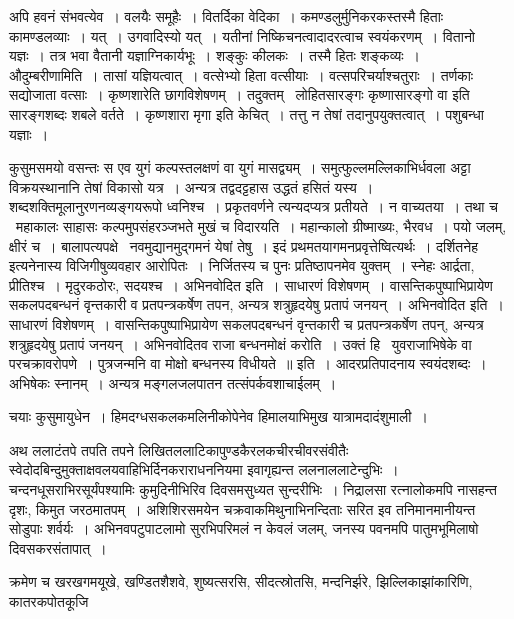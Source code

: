 \documentclass[11pt, openany]{book}
\begin{document}
\noindent
{\s अपि हवनं संभवत्येव~। वलयैः समूहैः~। वितर्दिका वेदिका~। कमण्डलुर्मुनिकरकस्तस्मै हिताः कामण्डलव्याः~। यत्~। {\qt उगवादिस्यो यत्}~। यतीनां निष्किचनत्वादादरत्वाच स्वयंकरणम्~। वितानो यज्ञः~। तत्र भवा वैतानी यज्ञाग्निकार्यभूः~। शङ्कुः कीलकः~। तस्मै हितः शङ्कव्यः~। {\qtt औदुम्बरीणामिति}~। तासां यज्ञियत्वात्~। वत्सेभ्यो हिता वत्सीयाः~। वत्सपरिचर्याश्चतुराः~। तर्णकाः सद्योजाता वत्साः~। कृष्णशारेति छागविशेषणम्~। तदुक्तम् \textendash\ {\qt लोहितसारङ्गः कृष्णासारङ्गो वा} इति सारङ्गशब्दः शबले वर्तते~। कृष्णशारा मृगा इति केचित्~। तत्तु न तेषां तदानुपयुक्तत्वात्~। पशुबन्धा यज्ञाः~।

कुसुमसमयो वसन्तः स एव युगं कल्पस्तलक्षणं वा युगं मासद्व्यम्~। समुत्फुल्लमल्लिकाभिर्धवला अट्टा विक्रयस्थानानि तेषां विकासो यत्र~। अन्यत्र तद्वदट्टहास उद्धतं हसितं यस्य~। शब्दशक्तिमूलानुरणनव्यङ्गयरूपो ध्वनिश्च~। प्रकृतवर्णने त्यन्यदप्यत्र प्रतीयते~। न वाच्यतया~। तथा च \textendash\ महाकालः साहासः कल्पमुपसंहरञ्जभते मुखं च विदारयति~। महान्कालो ग्रीष्माख्यः, भैरवध~। पयो जलम्, क्षीरं च~। बालापत्यपक्षे \textendash\ नवमुद्यानमुद्गमनं येषां तेषु~। इदं प्रथमतयागमनप्रवृत्तेष्वित्यर्थः~। दर्शितनेह इत्यनेनास्य विजिगीषुव्यवहार आरोपितः~। निर्जितस्य च पुनः प्रतिष्ठापनमेव युक्तम्~। स्नेहः आर्द्रता, प्रीतिश्च~। मृदुरकठोरः, सदयश्च~। अभिनवोदित इति~। साधारणं विशेषणम्~। वासन्तिकपुष्पाभिप्रायेण सकलपदबन्धनं वृन्तकारी व प्रतपन्त्रकर्षेण तपन, अन्यत्र शत्रुहृदयेषु प्रतापं जनयन्~। अभिनवोदित इति~। साधारणं विशेषणम्~। वासन्तिकपुष्पाभिप्रायेण सकलपदबन्धनं वृन्तकारी च प्रतपन्त्रकर्षेण तपन्, अन्यत्र शत्रुहृदयेषु प्रतापं जनयन्~। अभिनवोदितव राजा बन्धनमोक्षं करोति~। उक्तं हि \textendash\ {\qt युवराजाभिषेके वा परचक्रावरोपणे~। पुत्रजन्मनि वा मोक्षो बन्धनस्य विधीयते~॥} इति~। आदरप्रतिपादनाय स्वयंदशब्दः~। अभिषेकः स्नानम्~। अन्यत्र मङ्गलजलपातन तत्संपर्कवशाचाईलम्~।}


\newpage
\lfoot{}
\noindent
चयाः कुसुमायुधेन~। हिमदग्धसकलकमलिनीकोपेनेव हिमालयाभिमुख यात्रामदादंशुमाली~।

अथ ललाटंतपे तपति तपने लिखितललाटिकापुण्डकैरलकचीरचीवरसंवीतैः स्वेदोदबिन्दुमुक्ताक्षवलयवाहिभिर्दिनकराराधननियमा इवागृह्यन्त ललनाललाटेन्दुभिः~। चन्दनधूसराभिरसूर्यंपश्यामिः कुमुदिनीभिरिव दिवसमसुध्यत सुन्दरीभिः~। निद्रालसा रत्नालोकमपि नासहन्त दृशः, किमुत जरठमातपम्~। अशिशिरसमयेन चक्रवाकमिथुनाभिनन्दिताः सरित इव तनिमानमानीयन्त सोडुपाः शर्वर्यः~। अभिनवपटुपाटलामो सुरभिपरिमलं न केवलं जलम्, जनस्य पवनमपि पातुमभूमिलाषो दिवसकरसंतापात्~।

क्रमेण च खरखगमयूखे, खण्डितशैशवे, शुष्यत्सरसि, सीदत्स्रोतसि, मन्दनिर्झरे, झिल्लिकाझांकारिणि, कातरकपोतकूजि\textendash
\end{document}
